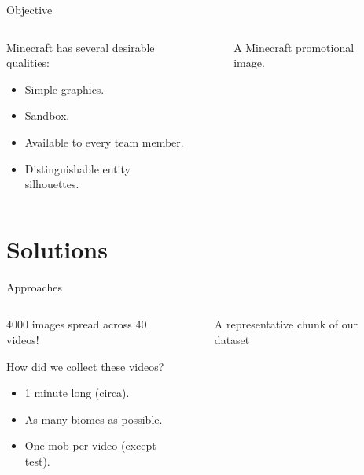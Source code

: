 \documentclass[english]{beamer}
\begin{document}
\begin{frame}{Objective}

  \begin{columns}
    
    \begin{column}{0.5\textwidth}
      Minecraft has several desirable qualities:
      \begin{itemize}
        \item Simple graphics.
        \item Sandbox.
        \item Available to every team member.
        \item Distinguishable entity silhouettes.
      \end{itemize}
    \end{column}

    \begin{column}{0.5\textwidth}
      \begin{figure}
        \centering
       \caption{A Minecraft promotional image.}
        \end{figure}
    \end{column}

  \end{columns}

\end{frame}

\section{Solutions}
\begin{frame}{Approaches}
  \begin{columns}
    \begin{column}{0.5\textwidth}
      4000 images spread across 40 videos!

      How did we collect these videos?
      \begin{itemize}
        \item 1 minute long (circa).
        \item As many biomes as possible.
        \item One mob per video (except test).
      \end{itemize}
    \end{column}

    \begin{column}{0.5\textwidth}
      \begin{figure}[h]
          \centering
          \caption{A representative chunk of our dataset}
      \end{figure}
    \end{column}

  \end{columns}
\end{frame}
\end{document}
